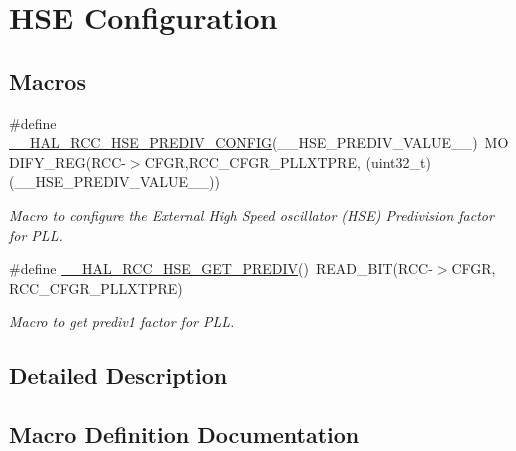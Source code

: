 \hypertarget{group___r_c_c_ex___h_s_e___configuration}{}\section{H\+SE Configuration}
\label{group___r_c_c_ex___h_s_e___configuration}
\subsection*{Macros}
\begin{DoxyCompactItemize}
\item 
\#define \hyperlink{group___r_c_c_ex___h_s_e___configuration_gafc6bfe4fd172ea49871172fa137b60e0}{\+\_\+\+\_\+\+H\+A\+L\+\_\+\+R\+C\+C\+\_\+\+H\+S\+E\+\_\+\+P\+R\+E\+D\+I\+V\+\_\+\+C\+O\+N\+F\+IG}(\+\_\+\+\_\+\+H\+S\+E\+\_\+\+P\+R\+E\+D\+I\+V\+\_\+\+V\+A\+L\+U\+E\+\_\+\+\_\+)~M\+O\+D\+I\+F\+Y\+\_\+\+R\+EG(R\+CC-\/$>$C\+F\+GR,R\+C\+C\+\_\+\+C\+F\+G\+R\+\_\+\+P\+L\+L\+X\+T\+P\+RE, (uint32\+\_\+t)(\+\_\+\+\_\+\+H\+S\+E\+\_\+\+P\+R\+E\+D\+I\+V\+\_\+\+V\+A\+L\+U\+E\+\_\+\+\_\+))
\begin{DoxyCompactList}\small\item\em Macro to configure the External High Speed oscillator (H\+SE) Predivision factor for P\+LL. \end{DoxyCompactList}\item 
\mbox{\label{group___r_c_c_ex___h_s_e___configuration_ga33799456f6dcbcdb9e66374277083d4c}} 
\#define \hyperlink{group___r_c_c_ex___h_s_e___configuration_ga33799456f6dcbcdb9e66374277083d4c}{\+\_\+\+\_\+\+H\+A\+L\+\_\+\+R\+C\+C\+\_\+\+H\+S\+E\+\_\+\+G\+E\+T\+\_\+\+P\+R\+E\+D\+IV}()~R\+E\+A\+D\+\_\+\+B\+IT(R\+CC-\/$>$C\+F\+GR, R\+C\+C\+\_\+\+C\+F\+G\+R\+\_\+\+P\+L\+L\+X\+T\+P\+RE)
\begin{DoxyCompactList}\small\item\em Macro to get prediv1 factor for P\+LL. \end{DoxyCompactList}\end{DoxyCompactItemize}


\subsection{Detailed Description}


\subsection{Macro Definition Documentation}
\mbox{\label{group___r_c_c_ex___h_s_e___configuration_gafc6bfe4fd172ea49871172fa137b60e0}} 
